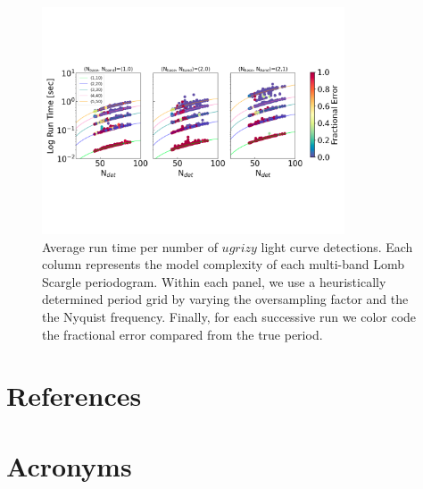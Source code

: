 \documentclass[DM,authoryear,toc]{lsstdoc}
\begin{document}




\begin{figure}
  \includegraphics[width=0.8\textwidth]{figures/run_time_analysis.pdf}
  \centering 
  \caption{Average run time per number of $ugrizy$ light curve detections. Each column represents the model complexity of each multi-band Lomb Scargle periodogram. Within each panel, we use a heuristically determined period grid by varying the oversampling factor and the the Nyquist frequency.  Finally, for each successive run we color code the fractional error compared from the true period.}
\end{figure}


\appendix
\section{References} \label{sec:bib}


\section{Acronyms} \label{sec:acronyms}

\end{document}
